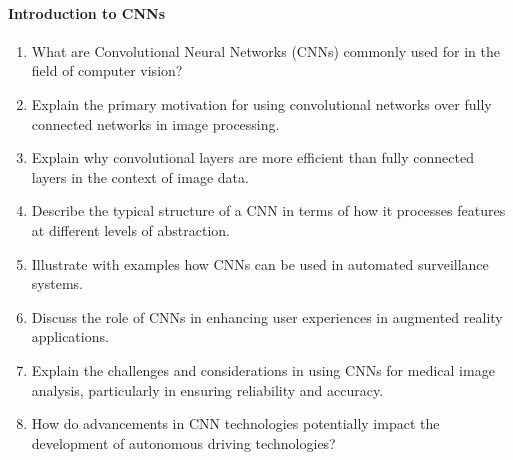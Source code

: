 \paragraph*{Introduction to CNNs}
\begin{enumerate}[nosep]
    \item What are Convolutional Neural Networks (CNNs) commonly used for in the field of computer vision?
    \item Explain the primary motivation for using convolutional networks over fully connected networks in image processing.
    \item Explain why convolutional layers are more efficient than fully connected layers in the context of image data.
    \item Describe the typical structure of a CNN in terms of how it processes features at different levels of abstraction.
    \item Illustrate with examples how CNNs can be used in automated surveillance systems.
    \item Discuss the role of CNNs in enhancing user experiences in augmented reality applications.
    \item Explain the challenges and considerations in using CNNs for medical image analysis, particularly in ensuring reliability and accuracy.
    \item How do advancements in CNN technologies potentially impact the development of autonomous driving technologies?
\end{enumerate}
